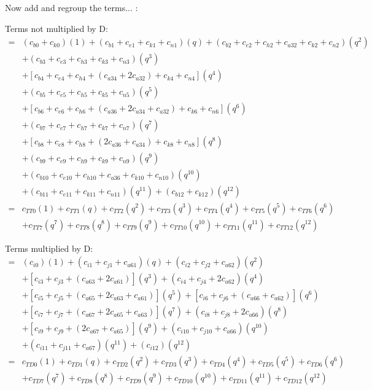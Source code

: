 \documentclass[12pt]{article}
\begin{document}
Now add and regroup the terms... :

Terms not multiplied by D:
\begin{align}
    =& (c_{b0} + c_{k0})(1) + (c_{b1} + c_{e1} + c_{k1} + c_{n1})(q) + (c_{b2} + c_{e2} +  c_{h2} + c_{a32} + c_{k2} + c_{n2})(q^2) \nonumber\\
    &+ (c_{b3} + c_{e3} + c_{h3} + c_{k3} + c_{n3})(q^3) \nonumber\\
    &+ [ c_{b4} + c_{e4} + c_{h4} + (c_{a34} + 2c_{a32}) + c_{k4} + c_{n4} ](q^4) \nonumber\\
    &+ (c_{b5} + c_{e5} + c_{h5} + c_{k5} + c_{n5})(q^5) \nonumber\\
    &+ [c_{b6} + c_{e6} + c_{h6} + (c_{a36} + 2c_{a34}+ c_{a32}) + c_{k6} +  c_{n6}](q^6) \nonumber\\
    &+ (c_{b7} + c_{e7} + c_{h7} + c_{k7} + c_{n7})(q^7) \nonumber\\
    &+ [ c_{b8} + c_{e8} + c_{h8} + (2c_{a36} + c_{a34}) + c_{k8} + c_{n8} ](q^8) \nonumber\\
    &+ (c_{b9} + c_{e9} + c_{h9} + c_{k9} + c_{n9} )(q^9) \nonumber\\
    &+ (c_{b10} + c_{e10} + c_{h10} +  c_{a36} + c_{k10} + c_{n10})(q^{10}) \nonumber\\
    &+ (c_{b11} + c_{e11} + c_{k11} + c_{n11})(q^{11}) + (c_{b12} + c_{k12})(q^{12}) \\
    =& c_{TT0}(1) + c_{TT1}(q) + c_{TT2}(q^2) + c_{TT3}(q^3) + c_{TT4}(q^4) + c_{TT5}(q^5) + c_{TT6}(q^6) \nonumber\\
    &+ c_{TT7}(q^7) + c_{TT8}(q^8) + c_{TT9}(q^9) + c_{TT10}(q^{10}) + c_{TT11}(q^{11}) + c_{TT12}(q^{12})
\end{align}

Terms multiplied by D:
\begin{align}
    =& (c_{i0})(1) + (c_{i1} + c_{j1} + c_{a61})(q) + (c_{i2} + c_{j2} + c_{a62})(q^2) \nonumber\\
    &+ [c_{i3} + c_{j3} + (c_{a63} + 2c_{a61})](q^3) + (c_{i4} + c_{j4} + 2c_{a62})(q^4) \nonumber\\
    &+ [c_{i5} + c_{j5} + (c_{a65} + 2c_{a63} + c_{a61})](q^5) + [c_{i6} + c_{j6} + (c_{a66} + c_{a62})](q^6) \nonumber\\
    &+ [c_{i7} + c_{j7} + (c_{a67} + 2c_{a65} + c_{a63})](q^7) + (c_{i8} + c_{j8} + 2c_{a66})(q^8) \nonumber\\
    &+ [c_{i9} + c_{j9} + (2c_{a67} + c_{a65})](q^9) + (c_{i10} + c_{j10} + c_{a66})(q^{10}) \nonumber\\
    &+ (c_{i11} + c_{j11} + c_{a67})(q^{11}) + (c_{i12})(q^{12})\\
    =& c_{TD0}(1) + c_{TD1}(q) + c_{TD2}(q^2) + c_{TD3}(q^3) + c_{TD4}(q^4) + c_{TD5}(q^5) + c_{TD6}(q^6) \nonumber\\
    &+ c_{TD7}(q^7) + c_{TD8}(q^8) + c_{TD9}(q^9) + c_{TD10}(q^{10}) + c_{TD11}(q^{11}) + c_{TD12}(q^{12})
\end{align}
\end{document}
